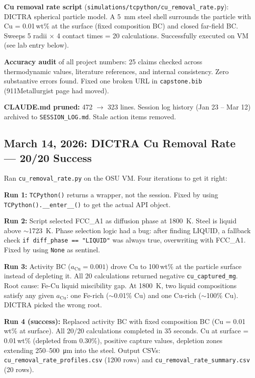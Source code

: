 \documentclass[11pt]{article}
\begin{document}
\textbf{Cu removal rate script} (\texttt{simulations/tcpython/cu\_removal\_rate.py}): DICTRA spherical particle model. A \SI{5}{\milli\meter} steel shell surrounds the particle with Cu = 0.01\,wt\% at the surface (fixed composition BC) and closed far-field BC. Sweeps 5 radii $\times$ 4 contact times = 20 calculations. Successfully executed on VM (see lab entry below).

\textbf{Accuracy audit} of all project numbers: 25 claims checked across thermodynamic values, literature references, and internal consistency. Zero substantive errors found. Fixed one broken URL in \texttt{capstone.bib} (911Metallurgist page had moved).

\textbf{CLAUDE.md pruned:} 472 $\to$ 323 lines. Session log history (Jan 23 -- Mar 12) archived to \texttt{SESSION\_LOG.md}. Stale action items removed.


\subsection{March 14, 2026: DICTRA Cu Removal Rate --- 20/20 Success}

Ran \texttt{cu\_removal\_rate.py} on the OSU VM. Four iterations to get it right:

\textbf{Run 1:} \texttt{TCPython()} returns a wrapper, not the session. Fixed by using \texttt{TCPython().\_\_enter\_\_()} to get the actual API object.

\textbf{Run 2:} Script selected FCC\_A1 as diffusion phase at \SI{1800}{\kelvin}. Steel is liquid above $\sim$\SI{1723}{\kelvin}. Phase selection logic had a bug: after finding LIQUID, a fallback check \texttt{if diff\_phase == "LIQUID"} was always true, overwriting with FCC\_A1. Fixed by using \texttt{None} as sentinel.

\textbf{Run 3:} Activity BC ($a_{\text{Cu}} = 0.001$) drove Cu to 100\,wt\% at the particle surface instead of depleting it. All 20 calculations returned negative \texttt{cu\_captured\_mg}. Root cause: Fe-Cu liquid miscibility gap. At \SI{1800}{\kelvin}, two liquid compositions satisfy any given $a_{\text{Cu}}$: one Fe-rich ($\sim$0.01\% Cu) and one Cu-rich ($\sim$100\% Cu). DICTRA picked the wrong root.

\textbf{Run 4 (success):} Replaced activity BC with fixed composition BC (Cu = 0.01\,wt\% at surface). All 20/20 calculations completed in 35 seconds. Cu at surface = 0.01\,wt\% (depleted from 0.30\%), positive capture values, depletion zones extending 250--\SI{500}{\micro\meter} into the steel. Output CSVs: \texttt{cu\_removal\_rate\_profiles.csv} (1200 rows) and \texttt{cu\_removal\_rate\_summary.csv} (20 rows).
\end{document}
